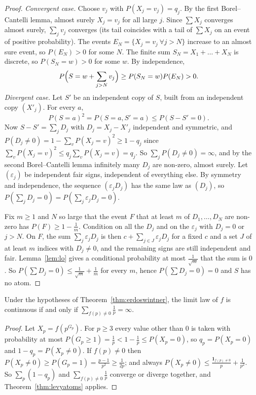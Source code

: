 \begin{proof}
\emph{Convergent case.} Choose $v_j$ with $P(X_j=v_j)=q_j$. By the first Borel--Cantelli lemma, almost surely $X_j=v_j$ for all large $j$. Since $\sum X_j$ converges almost surely, $\sum_jv_j$ converges (its tail coincides with a tail of $\sum X_j$ on an event of positive probability). The events $E_N=\{X_j=v_j\ \forall j>N\}$ increase to an almost sure event, so $P(E_N)>0$ for some $N$. The finite sum $S_N=X_1+\dots+X_N$ is discrete, so $P(S_N=w)>0$ for some $w$. By independence,
\[
P\Bigl(S=w+\sum_{j>N}v_j\Bigr)\ge P(S_N=w)P(E_N)>0.
\]
\emph{Divergent case.} Let $S'$ be an independent copy of $S$, built from an independent copy $(X'_j)$. For every $a$,
\[
P(S=a)^2=P(S=a,S'=a)\le P(S-S'=0).
\]
Now $S-S'=\sum_jD_j$ with $D_j=X_j-X'_j$ independent and symmetric, and $P(D_j\ne0)=1-\sum_vP(X_j=v)^2\ge1-q_j$ since $\sum_vP(X_j=v)^2\le q_j\sum_vP(X_j=v)=q_j$. So $\sum_jP(D_j\ne0)=\infty$, and by the second Borel--Cantelli lemma infinitely many $D_j$ are non-zero, almost surely. Let $(\varepsilon_j)$ be independent fair signs, independent of everything else. By symmetry and independence, the sequence $(\varepsilon_jD_j)$ has the same law as $(D_j)$, so $P(\sum_jD_j=0)=P(\sum_j\varepsilon_jD_j=0)$.

Fix $m\ge1$ and $N$ so large that the event $F$ that at least $m$ of $D_1,\dots,D_N$ are non-zero has $P(F)\ge1-\frac1m$. Condition on all the $D_j$ and on the $\varepsilon_j$ with $D_j=0$ or $j>N$. On $F$, the sum $\sum_j\varepsilon_jD_j$ is then $c+\sum_{j\in J}\varepsilon_jD_j$ for a fixed $c$ and a set $J$ of at least $m$ indices with $D_j\ne0$, and the remaining signs are still independent and fair. Lemma~\ref{lem:lo} gives a conditional probability at most $\frac1{\sqrt m}$ that the sum is $0$. So $P(\sum D_j=0)\le\frac1{\sqrt m}+\frac1m$ for every $m$, hence $P(\sum D_j=0)=0$ and $S$ has no atom.
\end{proof}

\begin{corollary}\label{cor:ewcont}
Under the hypotheses of Theorem~\ref{thm:erdoswintner}, the limit law of $f$ is continuous if and only if $\sum_{f(p)\ne0}\frac1p=\infty$.
\end{corollary}
\begin{proof}
Let $X_p=f(p^{G_p})$. For $p\ge3$ every value other than $0$ is taken with probability at most $P(G_p\ge1)=\frac1p<1-\frac1p\le P(X_p=0)$, so $q_p=P(X_p=0)$ and $1-q_p=P(X_p\ne0)$. If $f(p)\ne0$ then $P(X_p\ne0)\ge P(G_p=1)=\frac{p-1}{p^2}\ge\frac1{2p}$; and always $P(X_p\ne0)\le\frac{\mathbf 1_{f(p)\ne0}}p+\frac1{p^2}$. So $\sum_p(1-q_p)$ and $\sum_{f(p)\ne0}\frac1p$ converge or diverge together, and Theorem~\ref{thm:levyatoms} applies.
\end{proof}

